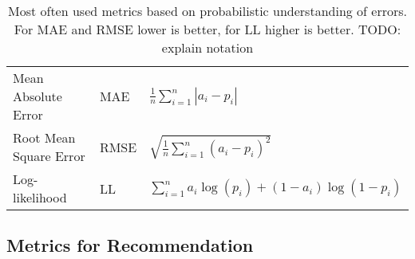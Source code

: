



\begin{table}
  \centering
  \caption{Most often used metrics based on probabilistic understanding of
    errors. For MAE and RMSE lower is better, for LL higher is better.
    TODO: explain notation}
  \label{tab:metrics}
  \begin{tabular}{lll}
    \toprule
    Mean Absolute Error & MAE & $\frac{1}{n} \sum_{i=1}^n |a_i - p_i|$ \\
    Root Mean Square Error & RMSE & $\sqrt{\frac{1}{n} \sum_{i=1}^n (a_i -
      p_i)^2}$ \\
    Log-likelihood & LL & $\sum_{i=1}^n a_i\log(p_i) + (1-a_i)\log(1-p_i)$ \\
    \bottomrule
  \end{tabular}
\end{table}




\subsection{Metrics for Recommendation}

